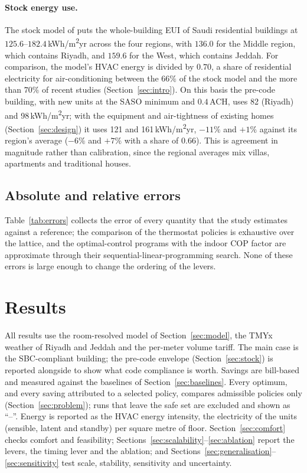 \documentclass[10pt,a4paper,twocolumn]{article}
\theoremstyle{definition}
\begin{document}
\paragraph{Stock energy use.} The stock model of \citet{stockmodel2020} puts the whole-building EUI of Saudi residential buildings at $125.6$--$182.4\,$kWh/m\textsuperscript{2}yr across the four regions, with $136.0$ for the Middle region, which contains Riyadh, and $159.6$ for the West, which contains Jeddah. For comparison, the model's HVAC energy is divided by $0.70$, a share of residential electricity for air-conditioning between the $66\%$ of the stock model and the more than $70\%$ of recent studies (Section~\ref{sec:intro}). On this basis the pre-code building, with new units at the SASO minimum and $0.4\,$ACH, uses 82 (Riyadh) and 98\,kWh/m\textsuperscript{2}yr; with the equipment and air-tightness of existing homes (Section~\ref{sec:design}) it uses 121 and 161\,kWh/m\textsuperscript{2}yr, $-11\%$ and $+1\%$ against its region's average ($-6\%$ and $+7\%$ with a share of $0.66$). This is agreement in magnitude rather than calibration, since the regional averages mix villas, apartments and traditional houses.

\subsection{Absolute and relative errors}\label{sec:errors}
Table~\ref{tab:errors} collects the error of every quantity that the study estimates against a reference; the comparison of the thermostat policies is exhaustive over the lattice, and the optimal-control programs with the indoor COP factor are approximate through their sequential-linear-programming search. None of these errors is large enough to change the ordering of the levers.

\section{Results}\label{sec:results}
All results use the room-resolved model of Section~\ref{sec:model}, the TMYx weather of Riyadh and Jeddah and the per-meter volume tariff. The main case is the SBC-compliant building; the pre-code envelope (Section~\ref{sec:stock}) is reported alongside to show what code compliance is worth. Savings are bill-based and measured against the baselines of Section~\ref{sec:baselines}. Every optimum, and every saving attributed to a selected policy, compares admissible policies only (Section~\ref{sec:problem}); runs that leave the safe set are excluded and shown as ``--''. Energy is reported as the HVAC energy intensity, the electricity of the units (sensible, latent and standby) per square metre of floor. Section~\ref{sec:comfort} checks comfort and feasibility; Sections~\ref{sec:scalability}--\ref{sec:ablation} report the levers, the timing lever and the ablation; and Sections~\ref{sec:generalisation}--\ref{sec:sensitivity} test scale, stability, sensitivity and uncertainty.
\end{document}
